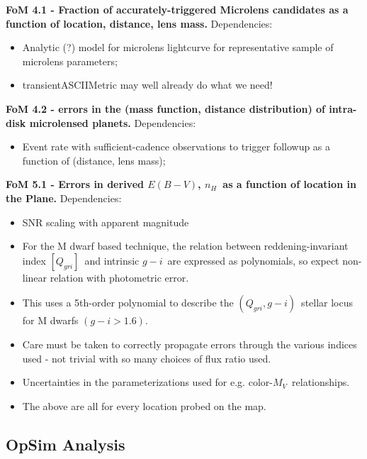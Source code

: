 {\bf FoM 4.1 - Fraction of accurately-triggered Microlens candidates as a function of location, distance, lens mass.}
Dependencies:
\begin{itemize}
  \item Analytic (?) model for microlens lightcurve for representative sample of microlens parameters;
    \item transientASCIIMetric may well already do what we need! 
\end{itemize}

{\bf FoM 4.2 - errors in the (mass function, distance distribution) of intra-disk microlensed planets.}
Dependencies:
\begin{itemize}
  \item Event rate with sufficient-cadence observations to trigger followup as a function of (distance, lens mass);
\end{itemize}

{\bf FoM 5.1 - Errors in derived $E(B-V)$, $n_H$~as a function of
  location in the Plane.}
Dependencies:
\begin{itemize}
  \item SNR scaling with apparent magnitude
    \item For the M dwarf based technique, the relation between
      reddening-invariant index $[Q_{gri}]$~and intrinsic $g-i$~are
      expressed as polynomials, so expect non-linear relation with
      photometric error.  
      \item This uses a 5th-order polynomial to describe the
        $(Q_{gri}, g-i)$~stellar locus for M dwarfs $(g-i > 1.6)$.
        \item Care must be taken to correctly propagate errors through
          the various indices used - not trivial with so many choices
          of flux ratio used.
          \item Uncertainties in the parameterizations used for e.g. color-$M_V$~relationships.
            \item The above are all for every location probed on the map.
\end{itemize}




\subsection{OpSim Analysis}
\label{sec:keyword:MW_Disk_analysis}

